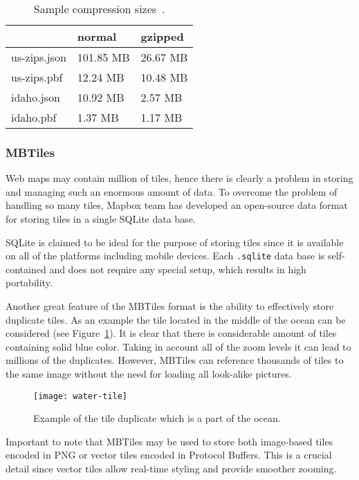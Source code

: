 \begin{table}[ht]
  \renewcommand{\arraystretch}{1.5}
  \centering
  \begin{tabular}{l l l}
    \hline
    & \textbf{normal} & \textbf{gzipped} \\
    \hline
    us-zips.json & 101.85 MB & 26.67 MB \\
    us-zips.pbf & 12.24 MB & 10.48 MB \\
    idaho.json & 10.92 MB & 2.57 MB \\
    idaho.pbf & 1.37 MB & 1.17 MB \\
    \hline
  \end{tabular}

  \caption{Sample compression sizes~\cite{geobuf}.}
  \label{tab:geobuf}
\end{table}

\subsubsection{MBTiles}

Web maps may contain million of tiles, hence there is clearly a problem in storing and managing such
an enormous amount of data. To overcome the problem of handling so many tiles, Mapbox team has
developed an open-source data format for storing tiles in a single SQLite data base.

SQLite is claimed to be ideal for the purpose of storing tiles since it is available on all of the
platforms including mobile devices. Each \texttt{.sqlite} data base is self-contained and does not
require any special setup, which results in high portability.

Another great feature of the MBTiles format is the ability to effectively store duplicate tiles. As
an example the tile located in the middle of the ocean can be considered (see
Figure~\ref{pic:water-tile}). It is clear that there is considerable amount of tiles containing
solid blue color. Taking in account all of the zoom levels it can lead to millions of the
duplicates. However, MBTiles can reference thousands of tiles to the same image without
the need for loading all look-alike pictures.

\begin{figure}[ht]
  {\par\centering
  \texttt{[image: water-tile]}
  \par}
  \caption{Example of the tile duplicate which is a part of the ocean.}
  \label{pic:water-tile}
\end{figure}

Important to note that MBTiles may be used to store both image-based tiles encoded in PNG or
vector tiles encoded in Protocol Buffers. This is a crucial detail since vector tiles
allow real-time styling and provide smoother zooming.







